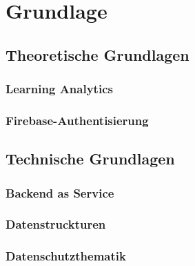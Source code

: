 \chapter{Grundlage}
\section{Theoretische Grundlagen}
\subsection{Learning Analytics}
\subsection{Firebase-Authentisierung}
\section{Technische Grundlagen}
\subsection{Backend as Service}
\subsection{Datenstruckturen}
\subsection{Datenschutzthematik}
